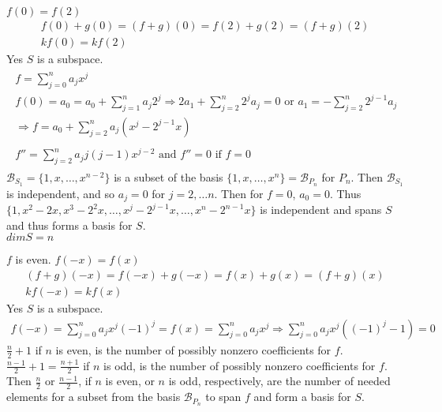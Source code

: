 \documentclass[twoside]{amsart}
\theoremstyle{plain}
\theoremstyle{definition}
\newcommand{\exercisehead}[1]
  {
   \noindent{\small\bf Exercise #1.}
   \smallskip}
\begin{document}
\exercisehead{16} $f(0) = f(2)$
\[
\begin{gathered}
  f(0) + g(0) = (f+g)(0) = f(2) + g(2) = (f+g)(2) \\
  kf(0) = kf(2) 
\end{gathered}
\]
Yes $S$ is a subspace.  
\[
\begin{gathered}
\begin{gathered}
  f = \sum_{j=0}^n a_j x^j \\
  f(0) = a_0 = a_0 + \sum_{j=1}^n a_j 2^j \Longrightarrow 2a_1 + \sum_{j=2}^n 2^j a_j = 0 \text{ or } a_1 = -\sum_{j=2}^n 2^{j-1}a_j \\
  \Longrightarrow f = a_0 + \sum_{j=2}^n a_j (x^j - 2^{j-1}x )
\end{gathered} \\
\begin{gathered}
  f'' = \sum_{j=2}^n a_j j(j-1)x^{j-2} \text{ and } f'' = 0 \text{ if } f = 0 
\end{gathered}
\end{gathered}
\]
$\mathcal{B}_{S_1} = \{ 1, x, \dots, x^{n-2} \}$ is a subset of the basis $\{ 1, x, \dots, x^n \} = \mathcal{B}_{P_n}$ for $P_n$.  Then $\mathcal{B}_{S_1}$ is independent, and so $a_j = 0$ for $j=2,\dots n$.  Then for $f=0$, $a_0 = 0$.  Thus $\{ 1, x^2-2x, x^3 - 2^2x,\dots, x^j - 2^{j-1}x, \dots, x^n - 2^{n-1} x \}$ is independent and spans $S$ and thus forms a basis for $S$.  \\
$\boxed{ dim{S} = n }$

\exercisehead{17} $f$ is even.  $f(-x) = f(x)$
\[
\begin{gathered}
  (f+g)(-x) = f(-x) + g(-x) = f(x) + g(x) = (f+g)(x) \\
  kf(-x) = kf(x)
\end{gathered}
\]
Yes $S$ is a subspace.  
\[
\begin{gathered}
f(-x) = \sum_{j=0}^n a_j x^j (-1)^j = f(x) = \sum_{j=0}^n a_j x^j  \Longrightarrow \sum_{j=0}^n a_j x^j ((-1)^j - 1) =0 
\end{gathered}
\]
$\frac{n}{2} + 1$ if $n$ is even, is the number of possibly nonzero coefficients for $f$.  \\
$\frac{n-1}{2} + 1 = \frac{n+1}{2}$ if $n$ is odd, is the number of possibly nonzero coefficients for $f$.  \medskip \\
Then $\frac{n}{2}$ or $\frac{n-1}{2}$, if $n$ is even, or $n$ is odd, respectively, are the number of needed elements for a subset from the basis $\mathcal{B}_{P_n}$ to span $f$ and form a basis for $S$.
\end{document}
